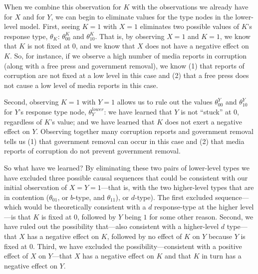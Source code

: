 \documentclass[12pt,]{book}
\begin{document}
When we combine this observation for \(K\) with the observations we already have for \(X\) and for \(Y\), we can begin to eliminate values for the type nodes in the lower-level model. First, seeing \(K=1\) with \(X=1\) eliminates two possible values of \(K\)'s response type, \(\theta_K\): \(\theta_{00}^{K}\) and \(\theta_{10}^{K}\). That is, by observing \(X=1\) and \(K=1\), we know that \(K\) is not fixed at \(0\), and we know that \(X\) does not have a negative effect on \(K\). So, for instance, if we observe a high number of media reports in corruption (along with a free press and government removal), we know (1) that reports of corruption are not fixed at a low level in this case and (2) that a free press does not cause a low level of media reports in this case.

Second, observing \(K=1\) with \(Y=1\) allows us to rule out the values \(\theta_{00}^{Y}\) and \(\theta_{10}^{Y}\) for \(Y\)'s response type node, \(\theta_Y^{lower}\): we have learned that \(Y\) is not ``stuck'' at \(0\), regardless of \(K\)'s value; and we have learned that \(K\) does not exert a negative effect on \(Y\). Observing together many corruption reports and government removal tells us (1) that government removal can occur in this case and (2) that media reports of corruption do not prevent government removal.

So what have we learned? By eliminating these two pairs of lower-level types we have excluded three possible causal sequences that could be consistent with our initial observation of \(X=Y=1\)---that is, with the two higher-level types that are in contention (\(\theta_{01}\), or \(b\)-type, and \(\theta_{11}\)), or \(d\)-type). The first excluded sequence---which would be theoretically consistent with a \(d\) response-type at the higher level---is that \(K\) is fixed at \(0\), followed by \(Y\) being \(1\) for some other reason. Second, we have ruled out the possibility that---also consistent with a higher-level \(d\) type---that \(X\) has a negative effect on \(K\), followed by no effect of \(K\) on \(Y\) because \(Y\) is fixed at \(0\). Third, we have excluded the possibility---consistent with a positive effect of \(X\) on \(Y\)---that \(X\) has a negative effect on \(K\) and that \(K\) in turn has a negative effect on \(Y\).
\end{document}
